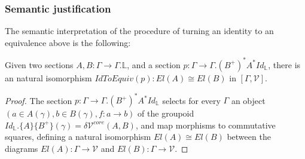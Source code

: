 \documentclass[a4paper,english]{lipics-v2018}
\begin{document}
  \subsubsection{Semantic justification}
  The semantic interpretation of the procedure of turning an identity to an equivalence above is the following:
  \begin{lemma}Given two sections $A, B : \Gamma \to \Gamma.\mathbb{L}$, and a section $p : \Gamma \to \Gamma.(B^+)^*A^*Id_{\mathbb{L}}$, there is an natural isomorphism $IdToEquiv(p) : El(A) \cong El(B)$ in $[\Gamma, \mathcal{V}]$.
    \begin{proof}The section $p : \Gamma \to \Gamma.(B^+)^*A^*Id_{\mathbb{L}}$ selects for every $\Gamma$ an object $(a \in A(\gamma), b \in B(\gamma), f : a \to b)$ of the groupoid $Id_{\mathbb{L}}.\{A\}\{B^+\}(\gamma) = \delta \mathcal{V}^{core}(A,B)$, and map morphisms to commutative squares, defining a natural isomorphism $El(A) \cong El(B)$ between the diagrams $El(A) : \Gamma \to \mathcal{V}$ and $El(B) : \Gamma \to \mathcal{V}$.
    \end{proof}
  \end{lemma}
 
\end{document}
